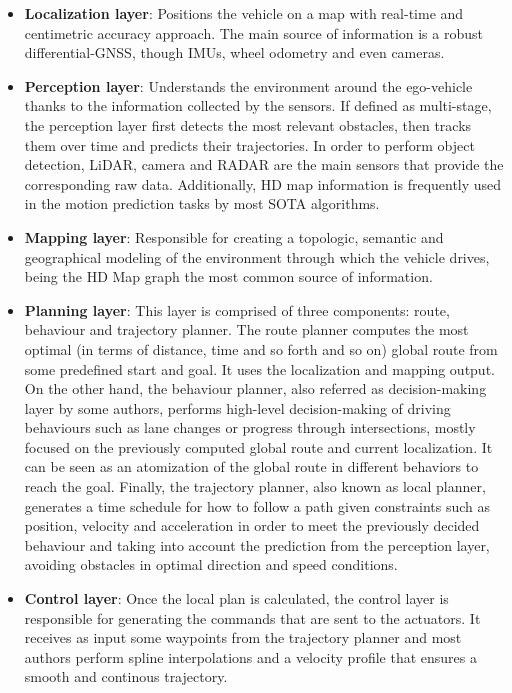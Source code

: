 \begin{itemize}
	
	\item \textbf{Localization layer}: Positions the vehicle on a map with real-time and centimetric accuracy approach. The main source of information is a robust differential-GNSS, though IMUs, wheel odometry and even cameras.
	
	\item \textbf{Perception layer}: Understands the environment around the ego-vehicle thanks to the information collected by the sensors. If defined as multi-stage, the perception layer first detects the most relevant obstacles, then tracks them over time and predicts their trajectories. In order to perform object detection, LiDAR, camera and RADAR are the main sensors that provide the corresponding raw data. Additionally, HD map information is frequently used in the motion prediction tasks by most \ac{SOTA} algorithms.
	
	\item \textbf{Mapping layer}: Responsible for creating a topologic, semantic and geographical modeling of the environment through which the vehicle drives, being the HD Map graph the most common source of information.
	
	\item \textbf{Planning layer}: This layer is comprised of three components: route, behaviour and trajectory planner. The route planner computes the most optimal (in terms of distance, time and so forth and so on) global route from some predefined start and goal. It uses the localization and mapping output. On the other hand, the behaviour planner, also referred as decision-making layer by some authors, performs high-level decision-making of driving behaviours such as lane changes or progress through intersections, mostly focused on the previously computed global route and current localization. It can be seen as an atomization of the global route in different behaviors to reach the goal. Finally, the trajectory planner, also known as local planner, generates a time schedule for how to follow a path given constraints such as position, velocity and acceleration in order to meet the previously decided behaviour and taking into account the prediction from the perception layer, avoiding obstacles in optimal direction and speed conditions.
	
	\item \textbf{Control layer}: Once the local plan is calculated, the control layer is responsible for generating the commands that are sent to the actuators. It receives as input some waypoints from the trajectory planner and most authors perform spline interpolations and a velocity profile that ensures a smooth and continous trajectory. 
	
\end{itemize}

